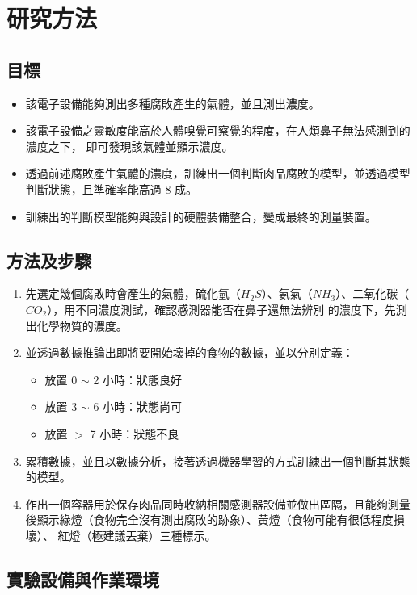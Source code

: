 \chapter{研究方法}

\section{目標}
\begin{itemize}
	\item 該電子設備能夠測出多種腐敗產生的氣體，並且測出濃度。
	\item 該電子設備之靈敏度能高於人體嗅覺可察覺的程度，在人類鼻子無法感測到的濃度之下，
		即可發現該氣體並顯示濃度。
	\item 透過前述腐敗產生氣體的濃度，訓練出一個判斷肉品腐敗的模型，並透過模型判斷狀態，且準確率能高過 8 成。 
	\item 訓練出的判斷模型能夠與設計的硬體裝備整合，變成最終的測量裝置。
\end{itemize}

\section{方法及步驟}
\begin{enumerate}
	\item 先選定幾個腐敗時會產生的氣體，硫化氫（$H_2S$）、氨氣（$NH_3$）、二氧化碳（$CO_2$），用不同濃度測試，確認感測器能否在鼻子還無法辨別
		的濃度下，先測出化學物質的濃度。
	\item 並透過數據推論出即將要開始壞掉的食物的數據，並以分別定義：\begin{itemize}
	 	\item 放置 0 $\sim$ 2 小時：狀態良好
		\item 放置 3 $\sim$ 6 小時：狀態尚可
		\item 放置 $>$ 7 小時：狀態不良
		\end{itemize}
	\item 累積數據，並且以數據分析，接著透過機器學習的方式訓練出一個判斷其狀態的模型。
	\item 作出一個容器用於保存肉品同時收納相關感測器設備並做出區隔，且能夠測量後顯示綠燈（食物完全沒有測出腐敗的跡象）、黃燈（食物可能有很低程度損壞）、
		紅燈（極建議丟棄）三種標示。 
\end{enumerate}

\section{實驗設備與作業環境}

